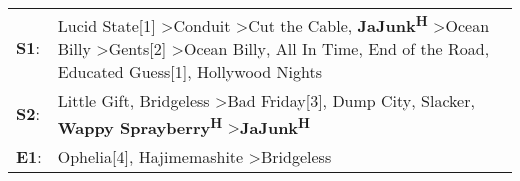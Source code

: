 \begin{supertabular}{p{0.03\textwidth}p{0.92\textwidth}}
 \textbf{S1}:  &  Lucid State[1]\textsuperscript{} \textgreater \enspace Conduit\textsuperscript{} \textgreater \enspace Cut the Cable\textsuperscript{}, \enspace \textbf{JaJunk\textsuperscript{H}} \textgreater \enspace Ocean Billy\textsuperscript{} \textgreater \enspace Gents[2]\textsuperscript{} \textgreater \enspace Ocean Billy\textsuperscript{}, \enspace All In Time\textsuperscript{}, \enspace End of the Road\textsuperscript{}, \enspace Educated Guess[1]\textsuperscript{}, \enspace Hollywood Nights\textsuperscript{}  \enspace  \\
 \textbf{S2}:  &                                                                                                                                                                                                         Little Gift\textsuperscript{}, \enspace Bridgeless\textsuperscript{} \textgreater \enspace Bad Friday[3]\textsuperscript{}, \enspace Dump City\textsuperscript{}, \enspace Slacker\textsuperscript{}, \enspace \textbf{Wappy Sprayberry\textsuperscript{H}} \textgreater \enspace \textbf{JaJunk\textsuperscript{H}}  \enspace  \\
 \textbf{E1}:  &                                                                                                                                                                                                                                                                                                                                                                                                    Ophelia[4]\textsuperscript{}, \enspace Hajimemashite\textsuperscript{} \textgreater \enspace Bridgeless\textsuperscript{}  \enspace  \\
\end{supertabular}
